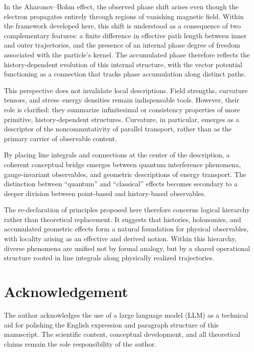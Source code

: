 \documentclass[%
 reprint,
 amsmath,amssymb,
 aps,
 prb,
]{revtex4-2}
\numberwithin{equation}{section}
\begin{document}
In the Aharonov--Bohm effect, the observed phase shift arises even though the electron propagates entirely through regions of vanishing magnetic field. Within the framework developed here, this shift is understood as a consequence of two complementary features: a finite difference in effective path length between inner and outer trajectories, and the presence of an internal phase degree of freedom associated with the particle’s kernel. The accumulated phase therefore reflects the history-dependent evolution of this internal structure, with the vector potential functioning as a connection that tracks phase accumulation along distinct paths.

This perspective does not invalidate local descriptions. Field strengths, curvature tensors, and stress--energy densities remain indispensable tools. However, their role is clarified: they summarize infinitesimal or consistency properties of more primitive, history-dependent structures. Curvature, in particular, emerges as a descriptor of the noncommutativity of parallel transport, rather than as the primary carrier of observable content.

By placing line integrals and connections at the center of the description, a coherent conceptual bridge emerges between quantum interference phenomena, gauge-invariant observables, and geometric descriptions of energy transport. The distinction between ``quantum'' and ``classical'' effects becomes secondary to a deeper division between point-based and history-based observables.

The re-declaration of principles proposed here therefore concerns logical hierarchy rather than theoretical replacement. It suggests that histories, holonomies, and accumulated geometric effects form a natural foundation for physical observables, with locality arising as an effective and derived notion. Within this hierarchy, diverse phenomena are unified not by formal analogy, but by a shared operational structure rooted in line integrals along physically realized trajectories.

\section*{Acknowledgement}

The author acknowledges the use of a large language model (LLM) as a technical aid for polishing the English expression and paragraph structure of this manuscript. The scientific content, conceptual development, and all theoretical claims remain the sole responsibility of the author.  
\end{document}
